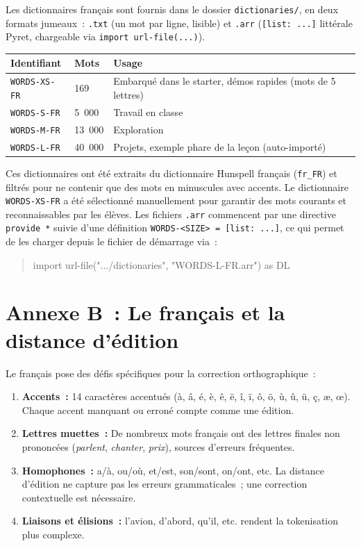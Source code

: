 \documentclass[12pt,a4paper]{article}
\begin{document}
Les dictionnaires français sont fournis dans le dossier \texttt{dictionaries/}, en deux formats jumeaux~: \texttt{.txt} (un mot par ligne, lisible) et \texttt{.arr} (\texttt{[list: ...]} littérale Pyret, chargeable via \texttt{import url-file(...)}).

\begin{center}
\begin{tabularx}{\textwidth}{l l X}
  \toprule
  \textbf{Identifiant} & \textbf{Mots} & \textbf{Usage} \\
  \midrule
  \texttt{WORDS-XS-FR} & 169 & Embarqué dans le starter, démos rapides (mots de 5 lettres) \\
  \texttt{WORDS-S-FR}  & 5~000 & Travail en classe \\
  \texttt{WORDS-M-FR}  & 13~000 & Exploration \\
  \texttt{WORDS-L-FR}  & 40~000 & Projets, exemple phare de la leçon (auto-importé) \\
  \bottomrule
\end{tabularx}
\end{center}

Ces dictionnaires ont été extraits du dictionnaire Hunspell français (\texttt{fr\_FR}) et filtrés pour ne contenir que des mots en minuscules avec accents. Le dictionnaire \texttt{WORDS-XS-FR} a été sélectionné manuellement pour garantir des mots courants et reconnaissables par les élèves. Les fichiers \texttt{.arr} commencent par une directive \texttt{provide *} suivie d'une définition \texttt{WORDS-<SIZE> = [list: ...]}, ce qui permet de les charger depuis le fichier de démarrage via~:

\begin{quote}
  \footnotesize\ttfamily
  import url-file(".../dictionaries", "WORDS-L-FR.arr") as DL
\end{quote}

\section*{Annexe B~: Le français et la distance d'édition}

Le français pose des défis spécifiques pour la correction orthographique~:

\begin{enumerate}[leftmargin=*]
  \item \textbf{Accents~:} 14 caractères accentués (à, â, é, è, ê, ë, î, ï, ô, ö, ù, û, ü, ç, æ, œ). Chaque accent manquant ou erroné compte comme une édition.
  \item \textbf{Lettres muettes~:} De nombreux mots français ont des lettres finales non prononcées (\emph{parlent}, \emph{chanter}, \emph{prix}), sources d'erreurs fréquentes.
  \item \textbf{Homophones~:} a/à, ou/où, et/est, son/sont, on/ont, etc. La distance d'édition ne capture pas les erreurs grammaticales~; une correction contextuelle est nécessaire.
  \item \textbf{Liaisons et élisions~:} l'avion, d'abord, qu'il, etc. rendent la tokenisation plus complexe.
\end{enumerate}
\end{document}
